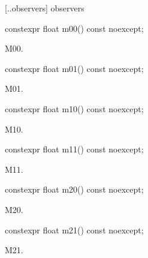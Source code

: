  [\iotwod.\matrixtwod.observers] { observers}

%
\begin{itemdecl}
constexpr float m00() const noexcept;
\end{itemdecl}
\begin{itemdescr}
\pnum
\returns
M00.
\end{itemdescr}

%
\begin{itemdecl}
constexpr float m01() const noexcept;
\end{itemdecl}
\begin{itemdescr}
\pnum
\returns
M01.
\end{itemdescr}

%
\begin{itemdecl}
constexpr float m10() const noexcept;
\end{itemdecl}
\begin{itemdescr}
\pnum
\returns
M10.
\end{itemdescr}

%
\begin{itemdecl}
constexpr float m11() const noexcept;
\end{itemdecl}
\begin{itemdescr}
\pnum
\returns
M11.
\end{itemdescr}

%
\begin{itemdecl}
constexpr float m20() const noexcept;
\end{itemdecl}
\begin{itemdescr}
\pnum
\returns
M20.
\end{itemdescr}

%
\begin{itemdecl}
constexpr float m21() const noexcept;
\end{itemdecl}
\begin{itemdescr}
\pnum
\returns
M21.
\end{itemdescr}

